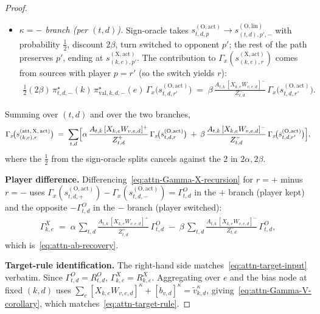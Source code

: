 \documentclass[twoside]{article}
\newcommand{\1}{\mathbf{1}}
\begin{document}
\begin{proof}
\begin{itemize}
\begin{align}
            \Gamma_x\!\bigl(s_{t,d,r}^{(\mathrm{O},\mathrm{act})}\bigr),
        \end{align}
        where cancellation applies when $\tilde{v}_{k,d}^+>0$. If this mass or $Z_{t,d}^+$ is zero,
the ordinary-successor contribution on both sides is zero by~\eqref{eq:attn-zero-ratio}.
    \item \emph{$\kappa = -$ branch (per $(t,d)$).} Sign-oracle takes $s_{t,d,p}^{(\mathrm{O},\mathrm{act})}
            \to s_{(t,d),p',-}^{(\mathrm{O},\mathrm{lin})}$ with probability $\tfrac12$, discount $2\beta$,
        turn switched to opponent $p'$; the rest of the path preserves $p'$, ending at
        $s_{(k,e),p'}^{(\mathrm{X},\mathrm{act})}$. The contribution to
        $\Gamma_x(s_{(k,e),r}^{(\mathrm{X},\mathrm{act})})$ comes from sources with player $p = r'$ (so the
        switch yields $r$):
        \begin{align}
            \tfrac12 (2\beta)\, \pi_{t,d,-}^\star(k)\, \pi_{\mathrm{val},k,d,-}^\star(e)\,
            \Gamma_x\!\bigl(s_{t,d,r'}^{(\mathrm{O},\mathrm{act})}\bigr)
            \;=\; \beta\, \frac{A_{t,k}\, [X_{k,e} W_{v,e,d}]^-}{Z_{t,d}^-}\,
            \Gamma_x\!\bigl(s_{t,d,r'}^{(\mathrm{O},\mathrm{act})}\bigr).
        \end{align}
\end{itemize}
Summing over $(t,d)$ and over the two branches,
\begin{align}\label{eq:attn-Gamma-X-recursion}
    \Gamma_x\!\bigl(s_{(k,e),r}^{(\mathrm{att},\,\mathrm{X},\,\mathrm{act})}\bigr)
    \;=\; \sum_{t,d} \Bigl[
    \alpha\, \frac{A_{t,k}\, [X_{k,e} W_{v,e,d}]^+}{Z_{t,d}^+}\,
    \Gamma_x\!\bigl(s_{t,d,r}^{(\mathrm{O},\mathrm{act})}\bigr)
    \;+\;
    \beta\, \frac{A_{t,k}\, [X_{k,e} W_{v,e,d}]^-}{Z_{t,d}^-}\,
    \Gamma_x\!\bigl(s_{t,d,r'}^{(\mathrm{O},\mathrm{act})}\bigr)
    \Bigr],
\end{align}
where the $\tfrac12$ from the sign-oracle splits cancels against the $2$ in $2\alpha, 2\beta$.

\textbf{Player difference.} Differencing~\eqref{eq:attn-Gamma-X-recursion} for $r{=}+$ minus
$r{=}-$ uses $\Gamma_x(s_{t,d,+}^{(\mathrm{O},\mathrm{act})}) -
    \Gamma_x(s_{t,d,-}^{(\mathrm{O},\mathrm{act})}) = \Gamma^{O}_{t,d}$ in the $+$ branch (player kept)
and the opposite $-\Gamma^{O}_{t,d}$ in the $-$ branch (player switched):
\begin{align}
    \Gamma^{X}_{k,e}
    \;=\; \alpha\, \sum_{t,d} \frac{A_{t,k}\, [X_{k,e} W_{v,e,d}]^+}{Z_{t,d}^+}\, \Gamma^{O}_{t,d}
    \;-\; \beta\, \sum_{t,d} \frac{A_{t,k}\, [X_{k,e} W_{v,e,d}]^-}{Z_{t,d}^-}\, \Gamma^{O}_{t,d},
\end{align}
which is~\eqref{eq:attn-ab-recovery}.

\textbf{Target-rule identification.} The right-hand side matches~\eqref{eq:attn-target-input}
verbatim. Since $\Gamma^{O}_{t,d} = R^{O}_{t,d}$, $\Gamma^{X}_{k,e} = R^{X}_{k,e}$. Aggregating
over $e$ and the bias node at fixed $(k,d)$ uses $\sum_e [X_{k,e} W_{v,e,d}]^\kappa +
    [b_{v,d}]^\kappa = \tilde{v}_{k,d}^\kappa$, giving~\eqref{eq:attn-Gamma-V-corollary}, which
matches~\eqref{eq:attn-target-rule}.
\end{proof}
\end{document}
